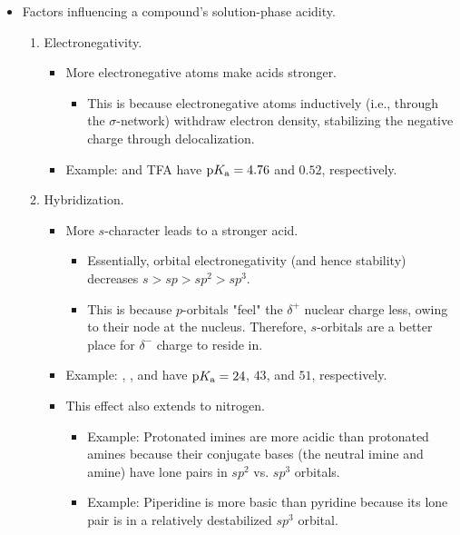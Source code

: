 \documentclass[../notes.tex]{subfiles}
\begin{document}
\begin{itemize}
\begin{itemize}
\begin{itemize}
        \end{itemize}
    \end{itemize}
    \pagebreak
    \item Factors influencing a compound's solution-phase acidity.
    \begin{enumerate}
        \item Electronegativity.
        \begin{itemize}
            \item More electronegative atoms make acids stronger.
            \begin{itemize}
                \item This is because electronegative atoms inductively (i.e., through the $\sigma$-network) withdraw electron density, stabilizing the negative charge through delocalization.
            \end{itemize}
            \item Example:  and TFA have $\textup{p}K_\textup{a}=4.76$ and $0.52$, respectively.
        \end{itemize}
        \item Hybridization.
        \begin{itemize}
            \item More $s$-character leads to a stronger acid.
            \begin{itemize}
                \item Essentially, orbital electronegativity (and hence stability) decreases $s>sp>sp^2>sp^3$.
                \item This is because $p$-orbitals "feel" the $\delta^+$ nuclear charge less, owing to their node at the nucleus. Therefore, $s$-orbitals are a better place for $\delta^-$ charge to reside in.
            \end{itemize}
            \item Example: , , and  have $\textup{p}K_\textup{a}=24$, $43$, and $51$, respectively.
            \item This effect also extends to nitrogen.
            \begin{itemize}
                \item Example: Protonated imines are more acidic than protonated amines because their conjugate bases (the neutral imine and amine) have lone pairs in $sp^2$ vs. $sp^3$ orbitals.
                \item Example: Piperidine is more basic than pyridine because its lone pair is in a relatively destabilized $sp^3$ orbital.

\end{itemize}
\end{itemize}
\end{enumerate}
\end{itemize}
\end{document}
